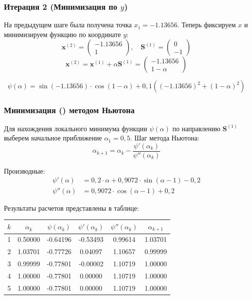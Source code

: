 \documentclass[a4paper,12pt]{article}
\begin{document}
\newpage
\subsubsection*{Итерация 2 (Минимизация по $y$)}
На предыдущем шаге была получена точка $x_1 = -1.13656$. Теперь фиксируем $x$ и минимизируем функцию по координате $y$:
\[
\mathbf{x}^{(2)} = \begin{pmatrix} -1.13656 \\ 1 \end{pmatrix}, \quad \mathbf{S}^{(1)} = \begin{pmatrix} 0 \\ -1 \end{pmatrix}
\]
\[
\mathbf{x}^{(2)} = \mathbf{x}^{(1)} + \alpha \mathbf{S}^{(1)} = \begin{pmatrix} -1.13656 \\ 1 - \alpha \end{pmatrix}
\]

\begin{equation}
    \psi(\alpha) = \sin(-1.13656) \cdot \cos(1-\alpha) + 0,1((-1.13656)^2 + (1-\alpha)^2)
\end{equation}

\subsubsection*{Минимизация \psi(\alpha) методом Ньютона}

Для нахождения локального минимума функции $\psi(\alpha)$ по направлению $\mathbf{S}^{(1)}$ выберем начальное приближение $\alpha_1 = 0,5$. Шаг метода Ньютона:
\[
\alpha_{k+1} = \alpha_k - \frac{\psi'(\alpha_k)}{\psi''(\alpha_k)}
\]

Производные:
\begin{align*}
    \psi'(\alpha) &= 0,2\cdot \alpha + 0,9072\cdot\sin(\alpha - 1) - 0,2 \\
    \psi''(\alpha) &= 0,9072\cdot\cos(\alpha - 1) + 0,2
\end{align*}


Результаты расчетов представлены в таблице:

\begin{center}
\begin{tabular}{|c|c|c|c|c|c|}
\hline
$k$ & $\alpha_k$ & $\psi(\alpha_k)$ & $\psi'(\alpha_k)$ & $\psi''(\alpha_k)$ & $\alpha_{k+1}$ \\ \hline
1 & 0.50000 & -0.64196 & -0.53493 & 0.99614 & 1.03701 \\ \hline
2 & 1.03701 & -0.77726 & 0.04097 & 1.10657 & 0.99999 \\ \hline
3 & 0.99999 & -0.77801 & -0.00002 & 1.10719 & 1.00000 \\ \hline
4 & 1.00000 & -0.77801 & 0.00000 & 1.10719 & 1.00000 \\ \hline
5 & 1.00000 & -0.77801 & 0.00000 & 1.10719 & 1.00000 \\ \hline
\end{tabular}
\end{center}
\end{document}
